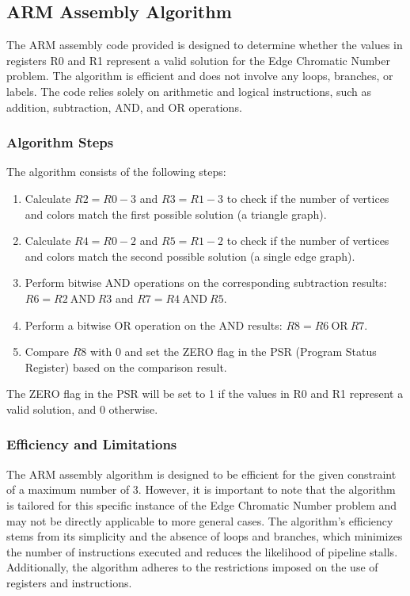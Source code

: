 \subsection{ARM Assembly Algorithm}

The ARM assembly code provided is designed to determine whether the values in registers R0 and R1 represent a valid solution for the Edge Chromatic Number problem. The algorithm is efficient and does not involve any loops, branches, or labels. The code relies solely on arithmetic and logical instructions, such as addition, subtraction, AND, and OR operations.

\subsubsection{Algorithm Steps}

The algorithm consists of the following steps:

\begin{enumerate}
    \item Calculate $R2 = R0 - 3$ and $R3 = R1 - 3$ to check if the number of vertices and colors match the first possible solution (a triangle graph).
    \item Calculate $R4 = R0 - 2$ and $R5 = R1 - 2$ to check if the number of vertices and colors match the second possible solution (a single edge graph).
    \item Perform bitwise AND operations on the corresponding subtraction results: $R6 = R2 \: \text{AND} \: R3$ and $R7 = R4 \: \text{AND} \: R5$.
    \item Perform a bitwise OR operation on the AND results: $R8 = R6 \: \text{OR} \: R7$.
    \item Compare $R8$ with 0 and set the ZERO flag in the PSR (Program Status Register) based on the comparison result.
\end{enumerate}

The ZERO flag in the PSR will be set to 1 if the values in R0 and R1 represent a valid solution, and 0 otherwise.

\subsubsection{Efficiency and Limitations}

The ARM assembly algorithm is designed to be efficient for the given constraint of a maximum number of 3. However, it is important to note that the algorithm is tailored for this specific instance of the Edge Chromatic Number problem and may not be directly applicable to more general cases. The algorithm's efficiency stems from its simplicity and the absence of loops and branches, which minimizes the number of instructions executed and reduces the likelihood of pipeline stalls. Additionally, the algorithm adheres to the restrictions imposed on the use of registers and instructions.

